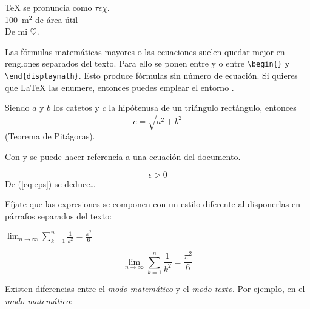 \begin{example}
\TeX{} se pronuncia como
 $\tau\epsilon\chi$.\\[6pt]
100~m$^{2}$ de área útil \\[6pt]
De mi $\heartsuit$.
\end{example}

Las  fórmulas  matemáticas  mayores  o las  ecuaciones  suelen  quedar
mejor  en renglones  separados del  texto.  Para ello  se ponen  entre
\ci{[}  y  \ci{]}  o  entre  \verb|\begin{|\verb|}|  y
\verb|\end{displaymath}|.   Esto  produce   fórmulas  sin   número  de
ecuación. Si quieres que \LaTeX{} las enumere, entonces puedes emplear
el entorno .

\begin{example}
Siendo $a$ y $b$ los catetos
y $c$ la hipótenusa
de un triángulo rectángulo,
entonces
\begin{displaymath}
c = \sqrt{  a^{2}+b^{2}  }
\end{displaymath}
(Teorema de Pitágoras).
\end{example}

Con  y  se puede hacer referencia a una ecuación del
documento.

\begin{example}
\begin{equation} \label{eq:eps}
\epsilon > 0
\end{equation}
De (\ref{eq:eps}) se deduce\ldots
\end{example}

Fíjate  que las  expresiones se  componen con  un estilo  diferente al
disponerlas en párrafos separados del texto:

\begin{example}
$\lim_{n \to \infty}
\sum_{k=1}^n \frac{1}{k^2}
= \frac{\pi^2}{6}$
\end{example}
\begin{example}
\begin{displaymath}
\lim_{n \to \infty}
\sum_{k=1}^n \frac{1}{k^2}
= \frac{\pi^2}{6}
\end{displaymath}
\end{example}


Existen diferencias  entre el  \emph{modo matemático} y  el \emph{modo
texto}. Por ejemplo, en el \emph{modo matemático}:

